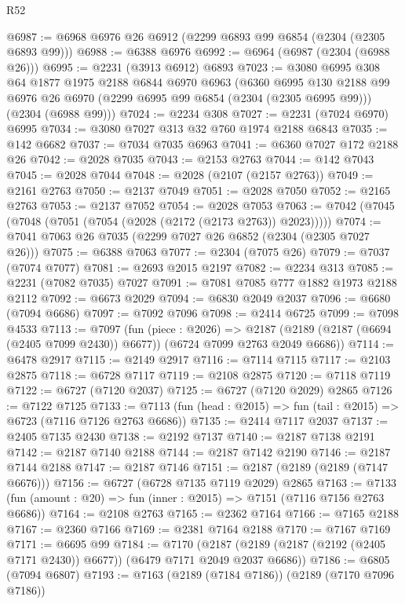 \begin{lexlean}{R52}
\begin{coremodule}
@6987 := @6968 @6976 @26 @6912 (@2299 @6893 @99 @6854 (@2304 (@2305 @6893 @99)))
@6988 := @6388 @6976
@6992 := @6964 (@6987 (@2304 (@6988 @26)))
@6995 := @2231 (@3913 @6912) @6893
@7023 := @3080
    @6995
    @308
    @64
    @1877
    @1975
    @2188
    @6844
    @6970
    @6963
    (@6360
      @6995
      @130
      @2188
      @99
      @6976
      @26
      @6970
      (@2299 @6995 @99 @6854 (@2304 (@2305 @6995 @99)))
      (@2304 (@6988 @99)))
@7024 := @2234 @308
@7027 := @2231 (@7024 @6970) @6995
@7034 := @3080 @7027 @313 @32 @760 @1974 @2188 @6843
@7035 := @142 @6682
@7037 := @7034 @7035 @6963
@7041 := @6360 @7027 @172 @2188 @26
@7042 := @2028 @7035
@7043 := @2153 @2763
@7044 := @142 @7043
@7045 := @2028 @7044
@7048 := @2028 (@2107 (@2157 @2763))
@7049 := @2161 @2763
@7050 := @2137 @7049
@7051 := @2028 @7050
@7052 := @2165 @2763
@7053 := @2137 @7052
@7054 := @2028 @7053
@7063 := @7042 (@7045 (@7048 (@7051 (@7054 (@2028 (@2172 (@2173 @2763)) @2023)))))
@7074 := @7041 @7063 @26 @7035 (@2299 @7027 @26 @6852 (@2304 (@2305 @7027 @26)))
@7075 := @6388 @7063
@7077 := @2304 (@7075 @26)
@7079 := @7037 (@7074 @7077)
@7081 := @2693 @2015 @2197
@7082 := @2234 @313
@7085 := @2231 (@7082 @7035) @7027
@7091 := @7081 @7085 @777 @1882 @1973 @2188 @2112
@7092 := @6673 @2029
@7094 := @6830 @2049 @2037
@7096 := @6680 (@7094 @6686)
@7097 := @7092 @7096
@7098 := @2414 @6725
@7099 := @7098 @4533
@7113 := @7097
    (fun (piece : @2026) =>
    @2187 (@2189 (@2187 (@6694 (@2405 @7099 @2430)) @6677)) (@6724 @7099 @2763 @2049 @6686))
@7114 := @6478 @2917
@7115 := @2149 @2917
@7116 := @7114 @7115
@7117 := @2103 @2875
@7118 := @6728 @7117
@7119 := @2108 @2875
@7120 := @7118 @7119
@7122 := @6727 (@7120 @2037)
@7125 := @6727 (@7120 @2029) @2865
@7126 := @7122 @7125
@7133 := @7113 (fun (head : @2015) => fun (tail : @2015) => @6723 (@7116 @7126 @2763 @6686))
@7135 := @2414 @7117 @2037
@7137 := @2405 @7135 @2430
@7138 := @2192 @7137
@7140 := @2187 @7138 @2191
@7142 := @2187 @7140 @2188
@7144 := @2187 @7142 @2190
@7146 := @2187 @7144 @2188
@7147 := @2187 @7146
@7151 := @2187 (@2189 (@2189 (@7147 @6676)))
@7156 := @6727 (@6728 @7135 @7119 @2029) @2865
@7163 := @7133 (fun (amount : @20) => fun (inner : @2015) => @7151 (@7116 @7156 @2763 @6686))
@7164 := @2108 @2763
@7165 := @2362 @7164
@7166 := @7165 @2188
@7167 := @2360 @7166
@7169 := @2381 @7164 @2188
@7170 := @7167 @7169
@7171 := @6695 @99
@7184 := @7170
    (@2187 (@2189 (@2187 (@2192 (@2405 @7171 @2430)) @6677)) (@6479 @7171 @2049 @2037 @6686))
@7186 := @6805 (@7094 @6807)
@7193 := @7163 (@2189 (@7184 @7186)) (@2189 (@7170 @7096 @7186))

\end{coremodule}
\end{lexlean}
